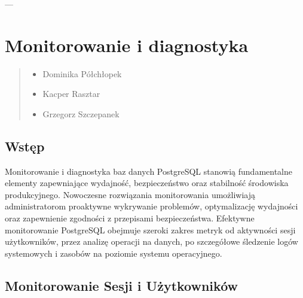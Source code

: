 \documentclass[letterpaper,10pt,polish]{sphinxmanual}
\begin{document}
\sphinxAtStartPar
—

\sphinxstepscope


\section{Monitorowanie i diagnostyka}
\label{\detokenize{rozdzial2/repo-wspolne/index:monitorowanie-i-diagnostyka}}\label{\detokenize{rozdzial2/repo-wspolne/index::doc}}\begin{quote}\begin{description}
\begin{itemize}
\item {} 
\sphinxAtStartPar
Dominika Półchłopek

\item {} 
\sphinxAtStartPar
Kacper Rasztar

\item {} 
\sphinxAtStartPar
Grzegorz Szczepanek

\end{itemize}

\end{description}\end{quote}


\subsection{Wstęp}
\label{\detokenize{rozdzial2/repo-wspolne/index:wstep}}
\sphinxAtStartPar
Monitorowanie i diagnostyka baz danych PostgreSQL stanowią fundamentalne elementy zapewniające wydajność, bezpieczeństwo oraz stabilność środowiska produkcyjnego. Nowoczesne rozwiązania monitorowania umożliwiają administratorom proaktywne wykrywanie problemów, optymalizację wydajności oraz zapewnienie zgodności z przepisami bezpieczeństwa. Efektywne monitorowanie PostgreSQL obejmuje szeroki zakres metryk \sphinxhyphen{} od aktywności sesji użytkowników, przez analizę operacji na danych, po szczegółowe śledzenie logów systemowych i zasobów na poziomie systemu operacyjnego.


\subsection{Monitorowanie   Sesji   i       Użytkowników}
\label{\detokenize{rozdzial2/repo-wspolne/index:monitorowanie-sesji-i-uzytkownikow}}
\end{document}
